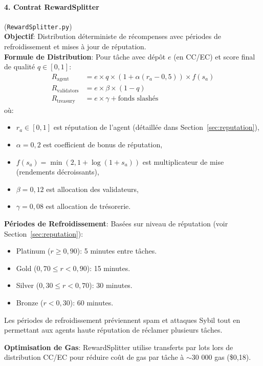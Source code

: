 \documentclass[11pt]{article}
\begin{document}
\paragraph{4. Contrat RewardSplitter} (\texttt{RewardSplitter.py})\\
\textbf{Objectif}: Distribution déterministe de récompenses avec périodes de refroidissement et mises à jour de réputation.\\
\textbf{Formule de Distribution}: Pour tâche avec dépôt $e$ (en CC/EC) et score final de qualité $q \in [0,1]$:
\begin{align}
R_{\text{agent}} &= e \times q \times \left(1 + \alpha (r_a - 0,5)\right) \times f(s_a) \label{eq:reward-agent} \\
R_{\text{validators}} &= e \times \beta \times (1-q) \label{eq:reward-validators} \\
R_{\text{treasury}} &= e \times \gamma + \text{fonds slashés} \label{eq:reward-treasury}
\end{align}
où:
\begin{itemize}[noitemsep]
  \item $r_a \in [0,1]$ est réputation de l'agent (détaillée dans Section~\ref{sec:reputation}),
  \item $\alpha = 0,2$ est coefficient de bonus de réputation,
  \item $f(s_a) = \min(2, 1 + \log(1+s_a))$ est multiplicateur de mise (rendements décroissants),
  \item $\beta = 0,12$ est allocation des validateurs,
  \item $\gamma = 0,08$ est allocation de trésorerie.
\end{itemize}
\textbf{Périodes de Refroidissement}: Basées sur niveau de réputation (voir Section~\ref{sec:reputation}):
\begin{itemize}[noitemsep]
  \item Platinum ($r \geq 0,90$): 5 minutes entre tâches.
  \item Gold ($0,70 \leq r < 0,90$): 15 minutes.
  \item Silver ($0,30 \leq r < 0,70$): 30 minutes.
  \item Bronze ($r < 0,30$): 60 minutes.
\end{itemize}
Les périodes de refroidissement préviennent spam et attaques Sybil tout en permettant aux agents haute réputation de réclamer plusieurs tâches.

\textbf{Optimisation de Gas}: RewardSplitter utilise transferts par lots lors de distribution CC/EC pour réduire coût de gas par tâche à $\sim$30 000 gas (\$0,18).
\end{document}
